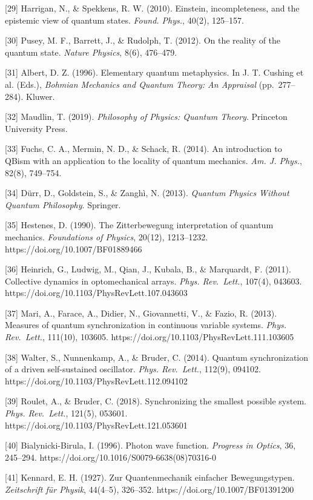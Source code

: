 \documentclass[
]{article}
\begin{document}
{[}29{]} Harrigan, N., \& Spekkens, R. W. (2010). Einstein,
incompleteness, and the epistemic view of quantum states. \emph{Found.
Phys.}, 40(2), 125--157.

{[}30{]} Pusey, M. F., Barrett, J., \& Rudolph, T. (2012). On the
reality of the quantum state. \emph{Nature Physics}, 8(6), 476--479.

{[}31{]} Albert, D. Z. (1996). Elementary quantum metaphysics. In J. T.
Cushing et al. (Eds.), \emph{Bohmian Mechanics and Quantum Theory: An
Appraisal} (pp.~277--284). Kluwer.

{[}32{]} Maudlin, T. (2019). \emph{Philosophy of Physics: Quantum
Theory}. Princeton University Press.

{[}33{]} Fuchs, C. A., Mermin, N. D., \& Schack, R. (2014). An
introduction to QBism with an application to the locality of quantum
mechanics. \emph{Am. J. Phys.}, 82(8), 749--754.

{[}34{]} Dürr, D., Goldstein, S., \& Zanghì, N. (2013). \emph{Quantum
Physics Without Quantum Philosophy}. Springer.

{[}35{]} Hestenes, D. (1990). The Zitterbewegung interpretation of
quantum mechanics. \emph{Foundations of Physics}, 20(12), 1213--1232.
https://doi.org/10.1007/BF01889466

{[}36{]} Heinrich, G., Ludwig, M., Qian, J., Kubala, B., \& Marquardt,
F. (2011). Collective dynamics in optomechanical arrays. \emph{Phys.
Rev.~Lett.}, 107(4), 043603.
https://doi.org/10.1103/PhysRevLett.107.043603

{[}37{]} Mari, A., Farace, A., Didier, N., Giovannetti, V., \& Fazio, R.
(2013). Measures of quantum synchronization in continuous variable
systems. \emph{Phys. Rev.~Lett.}, 111(10), 103605.
https://doi.org/10.1103/PhysRevLett.111.103605

{[}38{]} Walter, S., Nunnenkamp, A., \& Bruder, C. (2014). Quantum
synchronization of a driven self-sustained oscillator. \emph{Phys.
Rev.~Lett.}, 112(9), 094102.
https://doi.org/10.1103/PhysRevLett.112.094102

{[}39{]} Roulet, A., \& Bruder, C. (2018). Synchronizing the smallest
possible system. \emph{Phys. Rev.~Lett.}, 121(5), 053601.
https://doi.org/10.1103/PhysRevLett.121.053601

{[}40{]} Bialynicki-Birula, I. (1996). Photon wave function.
\emph{Progress in Optics}, 36, 245--294.
https://doi.org/10.1016/S0079-6638(08)70316-0

{[}41{]} Kennard, E. H. (1927). Zur Quantenmechanik einfacher
Bewegungstypen. \emph{Zeitschrift für Physik}, 44(4--5), 326--352.
https://doi.org/10.1007/BF01391200
\end{document}
